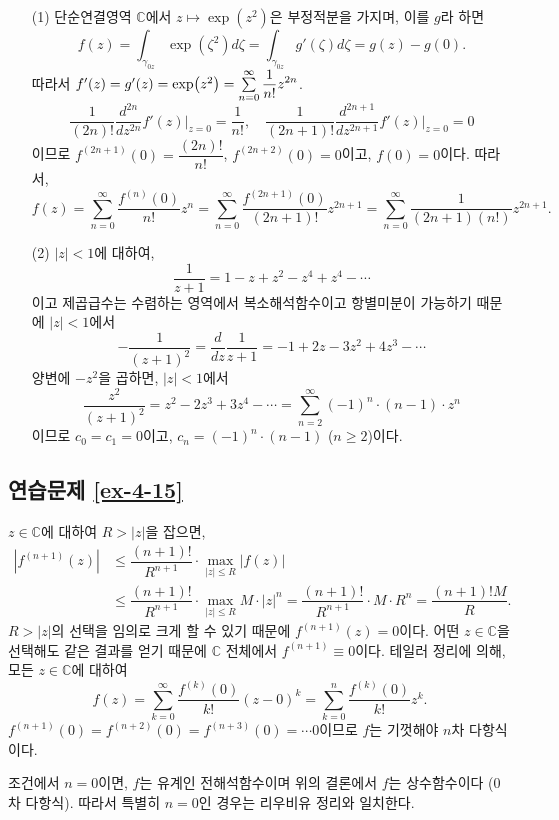 \begin{itemize}
\item[(1)] 
단순연결영역 $\mathbb C$에서
$z\mapsto \exp(z^2)$은 부정적분을 가지며, 이를 $g$라 하면
\[
f(z) = \int_{\gamma_{0z}} \exp(\zeta^2) d\zeta 
= \int_{\gamma_{0z}} g'(\zeta) d\zeta = g(z) - g(0).
\]
따라서 $f'(z) = g'(z) = \exp(z^2) = \sum\limits_{n=0}^\infty \displaystyle\frac1{n!}z^{2n}$.
\[
\dfrac1{(2n)!} \dfrac{d^{2n}}{dz^{2n}}f'(z) \Big|_{z=0} = \dfrac1{n!}, 
\quad
\dfrac1{(2n+1)!} \dfrac{d^{2n+1}}{dz^{2n+1}}f'(z) \Big|_{z=0} = 0
\]
이므로
$f^{(2n+1)}(0) = \dfrac{(2n)!}{n!}$, $f^{(2n+2)}(0) = 0$이고, $f(0)=0$이다.
따라서,
\[
f(z) = \sum_{n=0}^\infty \dfrac{f^{(n)}(0)}{n!} z^n 
= \sum_{n=0}^\infty \dfrac{f^{(2n+1)}(0)}{(2n+1)!} z^{2n+1}
= \sum_{n=0}^\infty \dfrac1{(2n+1)(n!)} z^{2n+1}.
\]
\item[(2)] 
$|z|<1$에 대하여,
\[
\dfrac1{z+1} = 1 - z + z^2 - z^4 + z^4 - \cdots
\]
이고 제곱급수는 수렴하는 영역에서 복소해석함수이고 항별미분이 가능하기 때문에
$|z|<1$에서
\[
- \dfrac1{(z+1)^2} = \dfrac d{dz}\dfrac1{z+1} = - 1 + 2z - 3z^2 + 4z^3 - \cdots
\]
양변에 $-z^2$을 곱하면, $|z|<1$에서
\[
 \dfrac{z^2}{(z+1)^2} =z^2 - 2z^3 + 3z^4 - \cdots
= \sum_{n=2}^\infty (-1)^n\cdot (n-1)\cdot z^n
\]
이므로 $c_0=c_1=0$이고, $c_n =(-1)^n\cdot(n-1)$ ($n\ge2$)이다.
\end{itemize}

\subsection*{연습문제 \ref{ex-4-15}}

$z\in\mathbb C$에 대하여 $R>|z|$을 잡으면,
\begin{align*}
|f^{(n+1)}(z)| &\le \dfrac{(n+1)!}{R^{n+1}}\cdot \max_{|z|\le R} |f(z)| \\
&\le \dfrac{(n+1)!}{R^{n+1}}\cdot \max_{|z|\le R} M\cdot |z|^n 
= \dfrac{(n+1)!}{R^{n+1}}\cdot M\cdot R^n = \dfrac{(n+1)!M}R.
\end{align*}
$R>|z|$의 선택을 임의로 크게 할 수 있기 때문에
$f^{(n+1)}(z) = 0$이다.
어떤 $z\in \mathbb C$을 선택해도 같은 결과를 얻기 때문에
$\mathbb C$ 전체에서 $f^{(n+1)} \equiv 0$이다.
테일러 정리에 의해,  모든 $z\in \mathbb C$에 대하여
\[
f(z) = \sum_{k=0}^\infty \dfrac{f^{(k)}(0)}{k!} (z-0)^k
= \sum_{k=0}^n \dfrac{f^{(k)}(0)}{k!} z^k.
\]
$f^{(n+1)}(0) = f^{(n+2)}(0) = f^{(n+3)}(0) = \cdots 0$이므로
$f$는 기껏해야 $n$차 다항식이다.

조건에서 $n=0$이면, $f$는 유계인 전해석함수이며
위의 결론에서 $f$는 상수함수이다 ($0$차 다항식).
따라서 특별히 $n=0$인 경우는 리우비유 정리와 일치한다.

